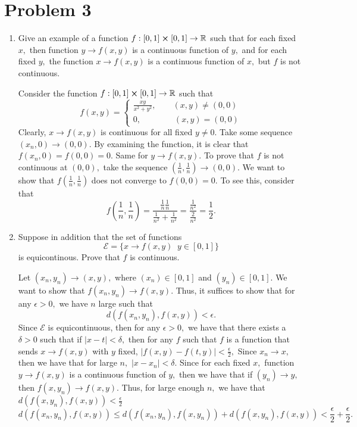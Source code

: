 \documentclass[11pt]{article}
\newcommand{\bbR}{\mathbb{R}}
\begin{document}
\newpage
\section*{Problem 3}
\begin{enumerate}
    \item 
\begin{problem}
    Give an example of a function $f: [0,1]\cross [0,1]\to \bbR$ such that for each fixed $x,$ then function $y \to f(x,y)$ is a continuous function of $y,$ and for each fixed $y,$ the function $x\to f(x,y)$ is a continuous function of $x,$ but $f$ is not continuous.
\end{problem}
\begin{solution}
    Consider the function $f: [0,1]\cross [0,1]\to \bbR$ such that \[f(x,y) = 
    \begin{cases}
        \frac{xy}{x^2 + y^2}, \qquad (x, y)\neq (0, 0)\\
        0,\qquad \qquad (x,y) = (0,0)
    \end{cases}\]
    Clearly, $x \to f(x,y)$ is continuous for all fixed $y\neq 0.$ Take some sequence $(x_n, 0)\to (0,0).$ By examining the function, it is clear that $f(x_n, 0) = f(0,0) = 0.$ Same for $y \to f(x,y).$ To prove that $f$ is not continuous at $(0,0),$ take the sequence $(\frac{1}{n}, \frac{1}{n}) \to (0,0).$ We want to show that $f(\frac{1}{n}, \frac{1}{n})$ does not converge to $f(0,0) = 0$. To see this, consider that 
    \[f(\frac{1}{n}, \frac{1}{n}) = \frac{\frac{1}{n}\frac{1}{n}}{\frac{1}{n^2} + \frac{1}{n^2}} = \frac{\frac{1}{n^2}}{\frac{2}{n^2}} =\frac{1}{2}.\]
\end{solution}
\item 
\begin{problem}
    Suppose in addition that the set of functions 
    \[\mathcal{E} = \{x \to f(x,y) \; \; y \in [0,1]\}\] is equicontinous. Prove that $f$ is continuous.
\end{problem}
\begin{solution}
    Let $(x_n, y_n) \to (x,y),$ where $(x_n)\in [0,1]$ and $(y_n)\in [0,1].$ We want to show that $f(x_n, y_n) \to f(x,y).$ Thus, it suffices to show that for any $\epsilon>0,$ we have $n$ large such that
    \[d(f(x_n, y_n), f(x,y))< \epsilon.\] 
    Since $\mathcal{E}$ is equicontinuous, then for any $\epsilon>0,$ we have that there exists a $\delta>0$ such that if $|x-t|< \delta,$ then for any $f$ such that $f$ is a function that sends $x\to f(x,y)$ with $y$ fixed, $|f(x,y) - f(t,y)|< \frac{\epsilon}{2},$ Since $x_n \to x,$ then we have that for large $n,$ $|x- x_n|< \delta.$ Since for each fixed $x,$ function $y \to f(x,y)$ is a continuous function of $y,$ then we have that if $(y_n) \to y,$ then $f(x, y_n) \to f(x,y).$ Thus, for large enough $n,$ we have that $d(f(x, y_n), f(x,y))< \frac{\epsilon}{2}$
    \[d(f(x_n, y_n), f(x,y)) \leq d(f(x_n, y_n), f(x,y_n)) + d(f(x, y_n), f(x,y)) < \frac{\epsilon}{2} + \frac{\epsilon}{2}.\]
\end{solution}
\end{enumerate}
\end{document}
